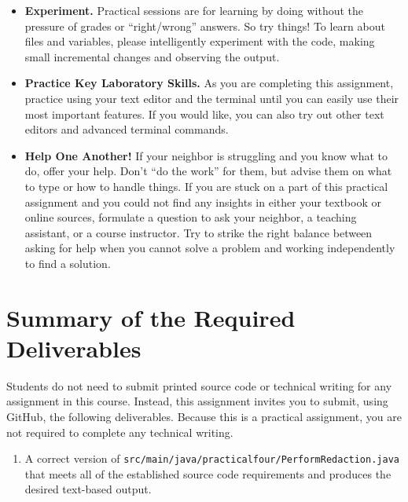 \documentclass[11pt]{article}
\newcommand{\mainprogramsource}{\lstinline{src/main/java/practicalfour/PerformRedaction.java}}
\begin{document}
\vspace*{-.05in}
\begin{itemize}

\itemsep 0in

\item {\bf Experiment.} Practical sessions are for learning by doing without the
  pressure of grades or ``right/wrong'' answers. So try things! To learn about
  files and variables, please intelligently experiment with the code, making
  small incremental changes and observing the output.

\item {\bf Practice Key Laboratory Skills.} As you are completing this
  assignment, practice using your text editor and the terminal until you can
  easily use their most important features. If you would like, you can also try
  out other text editors and advanced terminal commands.

\item {\bf Help One Another!} If your neighbor is struggling and you know what
  to do, offer your help. Don't ``do the work'' for them, but advise them on
  what to type or how to handle things. If you are stuck on a part of this
  practical assignment and you could not find any insights in either your
  textbook or online sources, formulate a question to ask your neighbor, a
  teaching assistant, or a course instructor. Try to strike the right balance
  between asking for help when you cannot solve a problem and working
  independently to find a solution.

\end{itemize}

\section*{Summary of the Required Deliverables}

\noindent Students do not need to submit printed source code or technical
writing for any assignment in this course. Instead, this assignment invites you
to submit, using GitHub, the following deliverables. Because this is a practical
assignment, you are not required to complete any technical writing.

\begin{enumerate}

\setlength{\itemsep}{0in}

\item A correct version of \mainprogramsource{} that meets all of the
  established source code requirements and produces the desired text-based
  output.

\end{enumerate}
\end{document}
